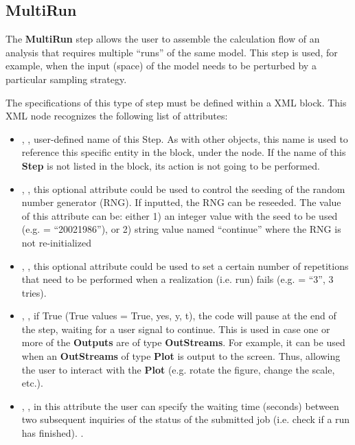 \subsection{MultiRun}
\label{subsec:stepMultiRun}
The \textbf{MultiRun} step allows the user to assemble the calculation flow of
an analysis that requires multiple ``runs'' of the same model.
%
This step is used, for example, when the input (space) of the model needs to be
perturbed by a particular sampling strategy.
%

The specifications of this type of step must be defined within a
 XML block.
%
This XML node recognizes the following list of attributes:
\vspace{-5mm}
\begin{itemize}
\itemsep0em
\item {}, , user-defined name of
this Step.
\nb As with other objects, this name is used to reference this specific entity
in the  block, under the  node. If the name
of this \textbf{Step} is not listed in the   block, its action is not
going to be performed.
\item {}, , this optional
attribute could be used to control the seeding of the random number generator (RNG).
If inputted, the RNG can be reseeded. The value of this attribute
can be: either 1) an integer value with the seed to be used (e.g.  =
``20021986''), or 2) string value named ``continue'' where the RNG is not re-initialized
\item {}, , this optional
attribute could be used to set a certain number of repetitions that need to be performed
when a realization (i.e. run) fails (e.g.  = ``3'', 3 tries).

\item {}, , if True
(True values = True, yes, y, t), the code will pause at the end of
the step, waiting for a user signal to continue. This is used in case one or
more of the \textbf{Outputs} are of type \textbf{OutStreams}.
For example, it can be used when an \textbf{OutStreams} of type
\textbf{Plot} is output to the screen. Thus, allowing the user to interact with
the \textbf{Plot} (e.g. rotate the figure, change the scale, etc.).
\item {}, , in this attribute
the user can specify the waiting time (seconds) between two subsequent inquiries
of the status of the submitted job (i.e. check if a run has finished).
.
\end{itemize}

